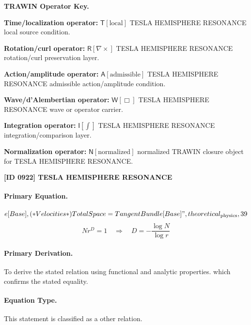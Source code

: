 \par\vspace{0.45\baselineskip}
\noindent\begin{minipage}[t]{\linewidth}
\begingroup
\small
\raggedright
\textbf{TRAWIN Operator Key.}\par
\noindent\textbf{Time/localization operator:} $\mathsf{T}\!\left[\mathrm{local}\right]$ TESLA HEMISPHERE RESONANCE local source condition.\par
\noindent\textbf{Rotation/curl operator:} $\mathsf{R}\!\left[\nabla\times\right]$ TESLA HEMISPHERE RESONANCE rotation/curl preservation layer.\par
\noindent\textbf{Action/amplitude operator:} $\mathsf{A}\!\left[\mathrm{admissible}\right]$ TESLA HEMISPHERE RESONANCE admissible action/amplitude condition.\par
\noindent\textbf{Wave/d'Alembertian operator:} $\mathsf{W}\!\left[\Box\right]$ TESLA HEMISPHERE RESONANCE wave or operator carrier.\par
\noindent\textbf{Integration operator:} $\mathsf{I}\!\left[\int\right]$ TESLA HEMISPHERE RESONANCE integration/comparison layer.\par
\noindent\textbf{Normalization operator:} $\mathsf{N}\!\left[\mathrm{normalized}\right]$ normalized TRAWIN closure object for TESLA HEMISPHERE RESONANCE.\par
\endgroup
\end{minipage}

\clearpage
\noindent\textbf{[ID 0922] TESLA HEMISPHERE RESONANCE}\par
\vspace{0.35em}
\paragraph{Primary Equation.}
\[
e[Base], (* Velocities *) TotalSpace = TangentBundle[Base]",theoretical_{\mathrm{physics}},39
\]
\[
N r^{D} = 1 \quad\Longrightarrow\quad D = -\frac{\log N}{\log r}
\]

\paragraph{Primary Derivation.}
To derive the stated relation using functional and analytic properties. which confirms the stated equality.
\paragraph{Equation Type.}
This statement is classified as a other relation.

